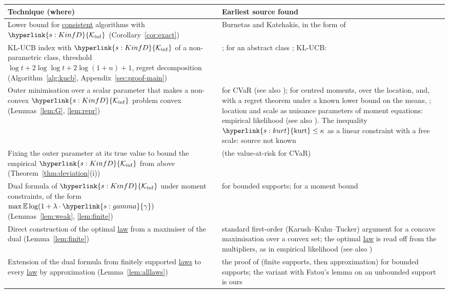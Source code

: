 \documentclass[11pt]{article}
\newcommand{\E}{\mathbb{E}}
\newcommand{\sy}[2]{{\hyperlink{#1}{#2}}}
\newcommand{\term}[2]{\hyperlink{#1}{#2}}
\newcommand{\kurt}{\sy{s:kurt}{\mathrm{kurt}}}
\newcommand{\Kinf}{\sy{s:KinfD}{\mathcal{K}_{\inf}}}
\newcommand{\gam}{\sy{s:gamma}{\gamma}}
\begin{document}
\begin{center}
\small
\begin{tabular}{@{}p{}p{}@{}}
\toprule
Technique (where) & Earliest source found \\
\midrule
Lower bound for \term{w:consistent}{consistent} algorithms with $\Kinf$ (Corollary~\ref{cor:exact}) & Burnetas and Katehakis, in the form of \citet[Theorem~16.2]{LS} \\
KL-UCB index with $\Kinf$ of a non-parametric class, threshold $\log t+2\log\log t+2\log(1+n)+1$, regret decomposition (Algorithm~\ref{alg:kucb}, Appendix~\ref{sec:proof-main}) & \citet[Algorithm~1, Theorem~1, Section~3.3]{AJK21}; for an abstract class \citet[Theorem~3.1]{PA26}; KL-UCB: \citet{CGMMS13} \\
Outer minimisation over a scalar parameter that makes a non-convex $\Kinf$ problem convex (Lemmas~\ref{lem:G}, \ref{lem:repr}) & \citet[Theorem~3.4]{AKJ21} for CVaR (see also \citealp[Chapter~6]{A22}); for centred moments, over the location, \citet[Section~6.10]{A22} and, with a regret theorem under a known lower bound on the means, \citet[Appendix~D.5 and Corollary~6]{BSH23}; location and scale as nuisance parameters of moment equations: empirical likelihood (see also \citealp[Sections~1.1 and 3.5]{O01}). The inequality $\kurt\le\kappa$ as a linear constraint with a free scale: source not known \\
Fixing the outer parameter at its true value to bound the empirical $\Kinf$ from above (Theorem~\ref{thm:deviation}(i)) & \citet[Appendix~6.D.1, equation~(6.55)]{A22} (the value-at-risk for CVaR) \\
Dual formula of $\Kinf$ under moment constraints, of the form $\max\E\log(1+\lambda\cdot\gam)$ (Lemmas~\ref{lem:weak}, \ref{lem:finite}) & \citet[Theorem~8]{HT10} for bounded supports; \citet[Lemma~7]{AJK21} for a moment bound \\
Direct construction of the optimal \term{w:law}{law} from a maximiser of the dual (Lemma~\ref{lem:finite}) & standard first-order (Karush--Kuhn--Tucker) argument for a concave maximisation over a convex set; the optimal \term{w:law}{law} is read off from the multipliers, as in empirical likelihood (see also \citealp[Section~3.14]{O01}) \\
Extension of the dual formula from finitely supported \term{w:law}{laws} to every \term{w:law}{law} by approximation (Lemma~\ref{lem:alllaws}) & the proof of \citet[Theorem~8]{HT10} (finite supports, then approximation) for bounded supports; the variant with Fatou's lemma on an unbounded support is ours \\

\end{tabular}
\end{center}
\end{document}
